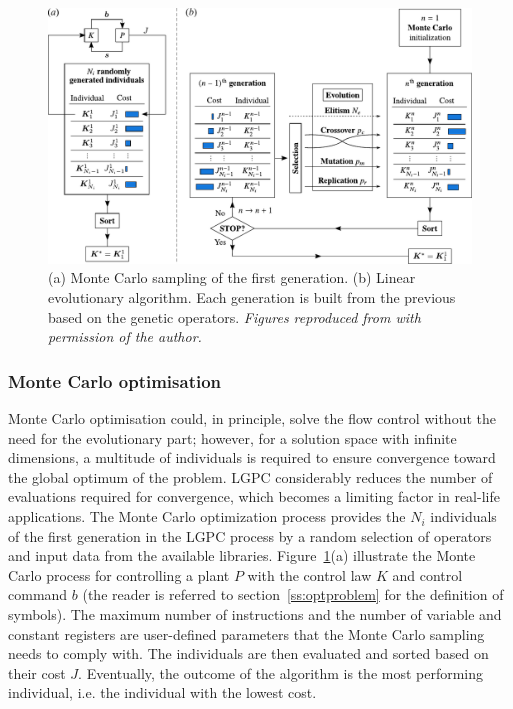 \begin{figure}
    \centering
    \includegraphics[width=0.99\linewidth]{figures/GPC_algorithm.pdf}
    \caption{(a) Monte Carlo sampling of the first generation. (b) Linear evolutionary algorithm. Each generation is built from the previous based on the genetic operators. \textit{Figures reproduced from \citet{cornejomacedaPhD} with permission of the author.}}
    \label{fig:GPC_algorithm}
\end{figure}

\subsubsection*{Monte Carlo optimisation}
Monte Carlo optimisation could, in principle, solve the flow control without the need for the evolutionary part; however, for a solution space with infinite dimensions, a multitude of individuals is required to ensure convergence toward the global optimum of the problem. LGPC considerably reduces the number of evaluations required for convergence, which becomes a limiting factor in real-life applications. The Monte Carlo optimization process provides the $N_i$ individuals of the first generation in the LGPC process by a random selection of operators and input data from the available libraries. Figure~\ref{fig:GPC_algorithm}(a) illustrate the Monte Carlo process for controlling a plant $P$ with the control law $K$ and control command $b$ (the reader is referred to section~\ref{ss:optproblem} for the definition of symbols). The maximum number of instructions and the number of variable and constant registers are user-defined parameters that the Monte Carlo sampling needs to comply with. The individuals are then evaluated and sorted based on their cost $J$. Eventually, the outcome of the algorithm is the most performing individual, i.e. the individual with the lowest cost.

